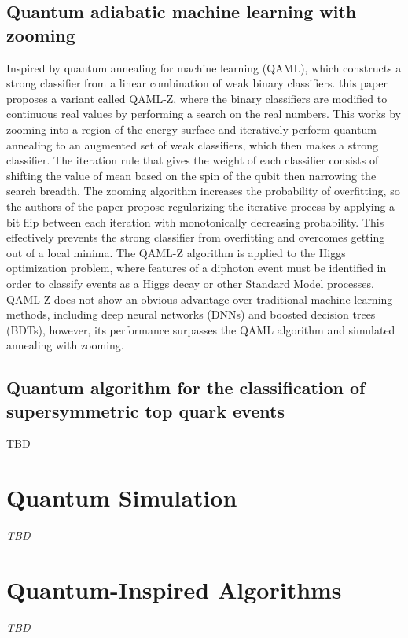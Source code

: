 \subsection{Quantum adiabatic machine learning with zooming~\cite{Zlokapa:2019lvv}}
Inspired by quantum annealing for machine learning (QAML), which constructs a strong classifier from a linear combination of weak binary classifiers. this paper proposes a variant called QAML-Z, where the binary classifiers are modified to continuous real values by performing a search on the real numbers. This works by zooming into a region of the energy surface and iteratively perform quantum annealing to an augmented set of weak classifiers, which then makes a strong classifier. The iteration rule that gives the weight of each classifier consists of shifting the value of mean based on the spin of the qubit then narrowing the search breadth. The zooming algorithm increases the probability of overfitting, so the authors of the paper propose regularizing the iterative process by applying a bit flip between each iteration with monotonically decreasing probability. This effectively prevents the strong classifier from overfitting and overcomes getting out of a local minima. The QAML-Z algorithm is applied to the Higgs optimization problem, where features of a diphoton event must be identified in order to classify events as a Higgs decay or other Standard Model processes. QAML-Z does not show an obvious advantage over traditional machine learning methods, including deep neural networks (DNNs) and boosted decision trees (BDTs), however, its performance surpasses the QAML algorithm and simulated annealing with zooming.
\subsection{Quantum algorithm for the classification of supersymmetric top quark events~\cite{Bargassa:2021jmk}}
TBD


\section{Quantum Simulation}

\textit{TBD}



\section{Quantum-Inspired Algorithms}

\textit{TBD}

